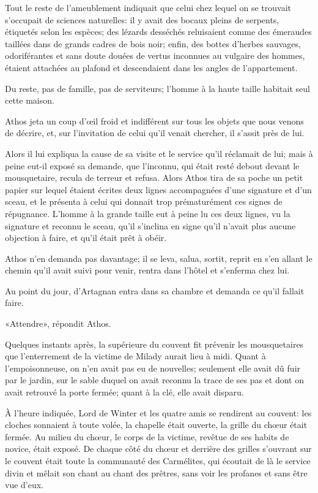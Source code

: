 Tout le reste de l'ameublement indiquait que celui chez lequel on se trouvait s'occupait de sciences naturelles: il y avait des bocaux pleins de serpents, étiquetés selon les espèces; des lézards desséchés reluisaient comme des émeraudes taillées dans de grands cadres de bois noir; enfin, des bottes d'herbes sauvages, odoriférantes et sans doute douées de vertus inconnues au vulgaire des hommes, étaient attachées au plafond et descendaient dans les angles de l'appartement. 

Du reste, pas de famille, pas de serviteurs; l'homme à la haute taille habitait seul cette maison. 

Athos jeta un coup d'œil froid et indifférent sur tous les objets que nous venons de décrire, et, sur l'invitation de celui qu'il venait chercher, il s'assit près de lui. 

Alors il lui expliqua la cause de sa visite et le service qu'il réclamait de lui; mais à peine eut-il exposé sa demande, que l'inconnu, qui était resté debout devant le mousquetaire, recula de terreur et refusa. Alors Athos tira de sa poche un petit papier sur lequel étaient écrites deux lignes accompagnées d'une signature et d'un sceau, et le présenta à celui qui donnait trop prématurément ces signes de répugnance. L'homme à la grande taille eut à peine lu ces deux lignes, vu la signature et reconnu le sceau, qu'il s'inclina en signe qu'il n'avait plus aucune objection à faire, et qu'il était prêt à obéir. 

Athos n'en demanda pas davantage; il se leva, salua, sortit, reprit en s'en allant le chemin qu'il avait suivi pour venir, rentra dans l'hôtel et s'enferma chez lui. 

Au point du jour, d'Artagnan entra dans sa chambre et demanda ce qu'il fallait faire. 

«Attendre», répondit Athos. 

Quelques instants après, la supérieure du couvent fit prévenir les mousquetaires que l'enterrement de la victime de Milady aurait lieu à midi. Quant à l'empoisonneuse, on n'en avait pas eu de nouvelles; seulement elle avait dû fuir par le jardin, sur le sable duquel on avait reconnu la trace de ses pas et dont on avait retrouvé la porte fermée; quant à la clé, elle avait disparu. 

À l'heure indiquée, Lord de Winter et les quatre amis se rendirent au couvent: les cloches sonnaient à toute volée, la chapelle était ouverte, la grille du chœur était fermée. Au milieu du chœur, le corps de la victime, revêtue de ses habits de novice, était exposé. De chaque côté du chœur et derrière des grilles s'ouvrant sur le couvent était toute la communauté des Carmélites, qui écoutait de là le service divin et mêlait son chant au chant des prêtres, sans voir les profanes et sans être vue d'eux. 

